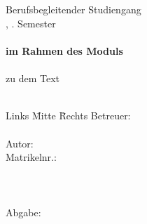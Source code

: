 \documentclass[12pt,oneside,titlepage,listof=totoc,bibliography=totoc]{scrartcl}
\begin{document}

\begin{titlepage}
	\begin{center}
		\textbf{\myHochschulName}\\
		\textbf{\myHochschulStandort}\\
		\vspace{2cm}
		Berufsbegleitender Studiengang\\
		\myStudiengang, \mySemesterZahl. Semester\\
		\vspace{1cm}
		\textbf{\myThesisArt}\\
		\textbf{im Rahmen des Moduls}\\
		\textbf{\myLehrveranstaltung}\\
		\vspace{1cm}
		zu dem Text\\
		\large{\myTitel}\\
		\vspace{0.2cm}
	\end{center}
	\normalsize
	\vfill
	\begin{tabbing}
		Links \= Mitte \= Rechts\kill
		Betreuer: \> \> \myBetreuer\\
		\> \> \\

		Autor: \> \> \myAutor\\
		\> \>  Matrikelnr.: \myMatrikelNr\\
		\> \> \myFachsemester\\
		\> \> \myAdresse\\
		\> \> \\
		Abgabe: \> \> \myAbgabeDatum
	\end{tabbing}
\end{titlepage}

\end{document}
